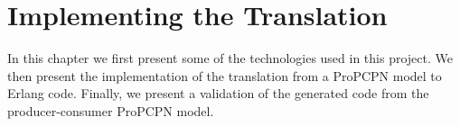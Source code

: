 \chapter{Implementing the Translation}
\label{chap:tool}
In this chapter we first present some of the technologies used in this project. We then present the implementation of the translation from a ProPCPN model to Erlang code. Finally, we present a validation of the generated code from the producer-consumer ProPCPN model.





